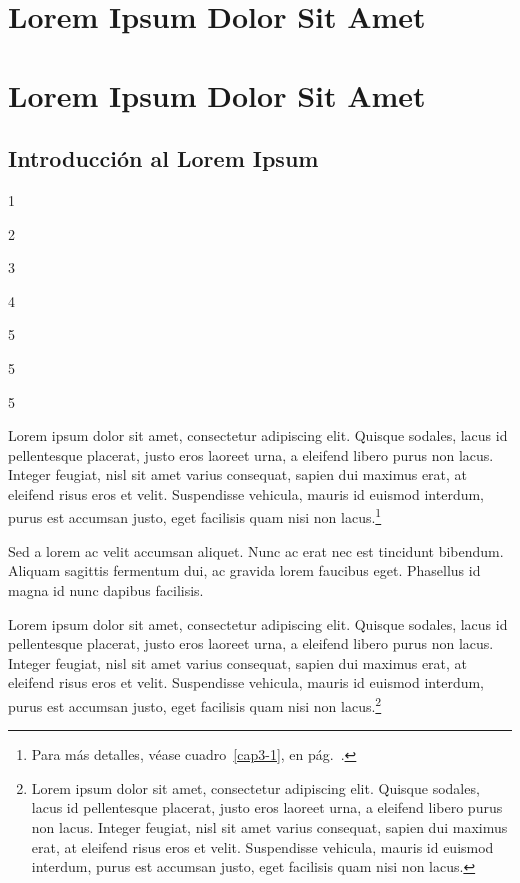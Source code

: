 \ifPDF
\chapter{Lorem Ipsum Dolor Sit Amet}
\setcounter{PrimPag}{\theCurrentPage}
	\else
	\ifHTMLEPUB
	\chapter{Lorem Ipsum Dolor Sit Amet}
	\fi
\fi

\section{Introducción al Lorem Ipsum}

1

2

3

4

5

5

5










Lorem ipsum dolor sit amet, consectetur adipiscing elit. Quisque sodales, lacus id pellentesque placerat, justo eros laoreet urna, a eleifend libero purus non lacus. Integer feugiat, nisl sit amet varius consequat, sapien dui maximus erat, at eleifend risus eros et velit. Suspendisse vehicula, mauris id euismod interdum, purus est accumsan justo, eget facilisis quam nisi non lacus.\footnote{Para más detalles, véase cuadro~\ref{cap3-1}, en pág.~\pageref{cap3-1}.}

Sed a lorem ac velit accumsan aliquet. Nunc ac erat nec est tincidunt bibendum. Aliquam sagittis fermentum dui, ac gravida lorem faucibus eget. Phasellus id magna id nunc dapibus facilisis.

Lorem ipsum dolor sit amet, consectetur adipiscing elit. Quisque sodales, lacus id pellentesque placerat, justo eros laoreet urna, a eleifend libero purus non lacus. Integer feugiat, nisl sit amet varius consequat, sapien dui maximus erat, at eleifend risus eros et velit. Suspendisse vehicula, mauris id euismod interdum, purus est accumsan justo, eget facilisis quam nisi non lacus.\footnote{Lorem ipsum dolor sit amet, consectetur adipiscing elit. Quisque sodales, lacus id pellentesque placerat, justo eros laoreet urna, a eleifend libero purus non lacus. Integer feugiat, nisl sit amet varius consequat, sapien dui maximus erat, at eleifend risus eros et velit. Suspendisse vehicula, mauris id euismod interdum, purus est accumsan justo, eget facilisis quam nisi non lacus.}

